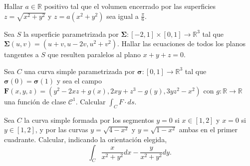 
\begin{question}
    Hallar $a \in \mathbb{R}$ positivo tal que el volumen encerrado por las superficies 
    $z = \sqrt{x^2+y^2}$ y $z = a \left( x^2+y^2 \right)$ sea igual a $\frac{\pi}{6}$.
\end{question}


\begin{question}
    Sea $S$ la superficie parametrizada por $\boldsymbol{\Sigma}: \left[-2,1\right] \times \left[0,1\right] \rightarrow \mathbb{R}^3$ tal que 
    $\boldsymbol{\Sigma}(u,v) = (u+v,u-2v,u^2+v^2)$. Hallar las ecuaciones de todos los planos tangentes 
    a $S$ que resulten paralelos al plano $x+y+z=0$.
\end{question}


\begin{question}
    Sea $C$ una curva simple parametrizada por $\boldsymbol{\sigma}:[0,1] \rightarrow \mathbb{R}^3$ tal que 
    $\boldsymbol{\sigma}(0)=\boldsymbol{\sigma}(1)$  y sea el campo $\mathbf{F}(x,y,z) = (y^2-2xz+g(x),2xy+z^3-g(y),3yz^2-x^2)$
    con $g:\mathbb{R}\rightarrow \mathbb{R}$ una función de clase $\mathcal{C}^1$. Calcular $\int_{C}F \cdot ds$.
\end{question}



\begin{question}
    Sea $C$ la curva simple formada por los segmentos $y=0$ si $x \in [1,2]$ y 
    $x=0$ si $y \in [1,2]$, y por las curvas $y=\sqrt{4-x^2}$ y $y=\sqrt{1-x^2}$ ambas en el primer
    cuadrante. Calcular, indicando la orientación elegida,
    \begin{equation*}
        \int_{C} \frac{x}{x^2+y^2}dx - \frac{y}{x^2+y^2}dy.
    \end{equation*}
\end{question}

